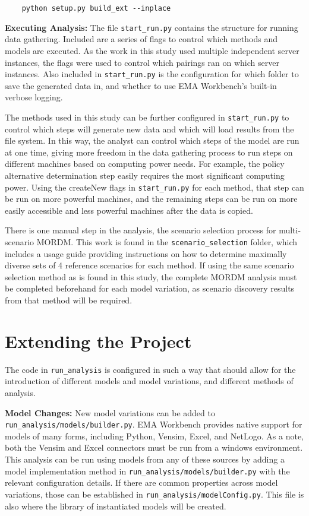 \begin{lstlisting}
    python setup.py build_ext --inplace
\end{lstlisting}

\textbf{Executing Analysis: }
The file \texttt{start_run.py} contains the structure for running data gathering. Included are a series of flags to control which methods and models are executed. As the work in this study used multiple independent server instances, the flags were used to control which pairings ran on which server instances. Also included in \texttt{start_run.py} is the configuration for which folder to save the generated data in, and whether to use EMA Workbench's built-in verbose logging. 

The methods used in this study can be further configured in \texttt{start_run.py} to control which steps will generate new data and which will load results from the file system. In this way, the analyst can control which steps of the model are run at one time, giving more freedom in the data gathering process to run steps on different machines based on computing power needs. For example, the policy alternative determination step easily requires the most significant computing power. Using the createNew flags in \texttt{start_run.py} for each method, that step can be run on more powerful machines, and the remaining steps can be run on more easily accessible and less powerful machines after the data is copied. 

There is one manual step in the analysis, the scenario selection process for multi-scenario MORDM. This work is found in the \texttt{scenario_selection} folder, which includes a usage guide providing instructions on how to determine maximally diverse sets of 4 reference scenarios for each method. If using the same scenario selection method as is found in this study, the complete MORDM analysis must be completed beforehand for each model variation, as scenario discovery results from that method will be required. 

\section{Extending the Project}
The code in \texttt{run_analysis} is configured in such a way that should allow for the introduction of different models and model variations, and different methods of analysis. 

\textbf{Model Changes: } New model variations can be added to \texttt{run_analysis/models/builder.py}. EMA Workbench provides native support for models of many forms, including Python, Vensim, Excel, and NetLogo. As a note, both the Vensim and Excel connectors must be run from a windows environment. This analysis can be run using models from any of these sources by adding a model implementation method in \texttt{run_analysis/models/builder.py} with the relevant configuration details. If there are common properties across model variations, those can be established in \texttt{run_analysis/modelConfig.py}. This file is also where the library of instantiated models will be created. 

